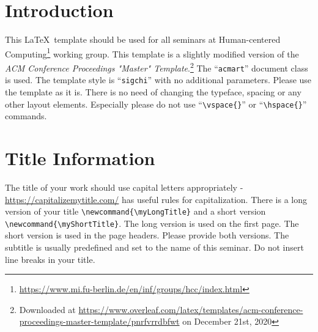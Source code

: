 \documentclass[sigchi]{acmart}
\makeatletter
\newcommand{\myLongTitle}{My Long Title of my Essay} %
\newcommand{\myShortTitle}{Short Title of Essay} %
\makeatother
\begin{document}
\maketitle


\let\oldaddcontentsline\addcontentsline
\newcommand{\stoptocentries}{\renewcommand{\addcontentsline}[3]{}}
\newcommand{\starttocentries}{\let\addcontentsline\oldaddcontentsline}

\stoptocentries%
\tableofcontents
\starttocentries%

\section{Introduction}
This \LaTeX\ template should be used for all seminars at Human-centered Computing\footnote{\url{https://www.mi.fu-berlin.de/en/inf/groups/hcc/index.html}} working group. This template is a slightly modified version of the \emph{ACM Conference Proceedings "Master" Template}.\footnote{Downloaded at \url{https://www.overleaf.com/latex/templates/acm-conference-proceedings-master-template/pnrfvrrdbfwt} on December 21st, 2020} The ``\verb|acmart|'' document class is used. The template style is ``\verb|sigchi|'' with no additional parameters. Please use the template as it is. There is no need of changing the typeface, spacing or any other layout elements. Especially please do not use ``\verb|\vspace{}|'' or ``\verb|\hspace{}|'' commands.


\section{Title Information}
The title of your work should use capital letters appropriately -
\url{https://capitalizemytitle.com/} has useful rules for
capitalization. There is a long version of your title {\verb|\newcommand{\myLongTitle}|} and a short version {\verb|\newcommand{\myShortTitle}|}. The long version is used on the first page. The short version is used in the page headers. Please provide both versions. The subtitle is usually predefined and set to the name of this seminar. Do not insert line breaks in your title.
\end{document}
